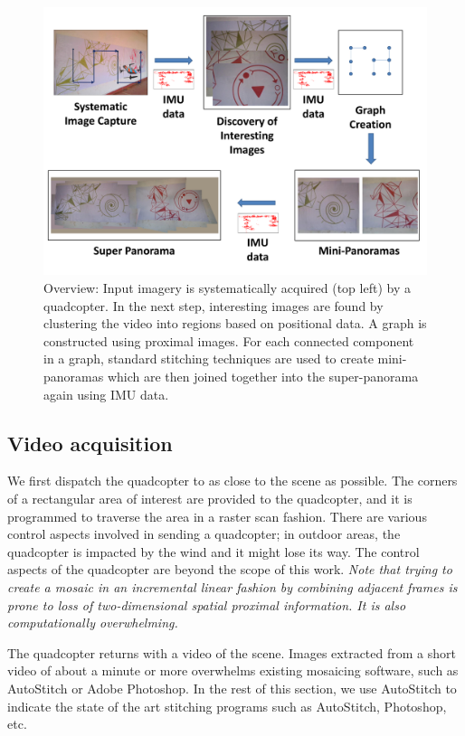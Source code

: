 \begin{figure}[h!]
  \centering
  \includegraphics[width=\textwidth]{figures/vacantSpaces/Workflow} 
  \caption[Workflow]{ \label{fig:vacantworkflow} Overview: Input imagery is
    systematically acquired (top left) by a quadcopter.  In the next
    step, interesting images are found by clustering the video into
    regions based on positional data.  A graph is constructed using
    proximal images. For each connected component in a graph, standard
    stitching techniques are used to create mini-panoramas which are
    then joined together into the super-panorama 
    again using IMU data.}
\end{figure}    


\subsection{Video acquisition}
We first dispatch the quadcopter to as close to the scene as
possible. The corners of a rectangular area of interest are provided
to the quadcopter, and it is programmed to traverse the area in a
raster scan fashion.  There are various control aspects involved in
sending a quadcopter; in outdoor areas, the quadcopter is impacted by
the wind and it might lose its way.  The control aspects of the quadcopter
are beyond the scope of this work.  \emph{Note that trying to create a
  mosaic in an incremental linear fashion by combining adjacent frames is
  prone to loss of two-dimensional spatial proximal information. It is also
  computationally overwhelming.}

The quadcopter returns with a video of the scene.  Images extracted
from a short video of about a minute or more overwhelms existing
mosaicing software, such as AutoStitch or Adobe Photoshop.  In the
rest of this section, we use AutoStitch to indicate the state of the art
stitching programs such as AutoStitch, Photoshop, etc.

